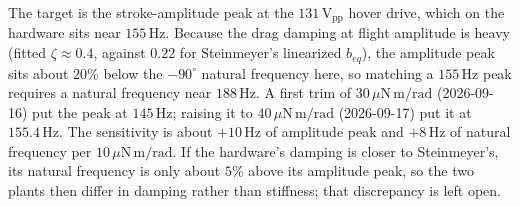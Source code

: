 \documentclass{article}
\begin{document}
The target is the stroke-amplitude peak at the \(131\,\mathrm{V_{pp}}\) hover drive, which on the hardware sits near \(155\,\mathrm{Hz}\). Because the drag damping at flight amplitude is heavy (fitted \(\zeta \approx 0.4\), against \(0.22\) for Steinmeyer's linearized \(b_{eq}\)), the amplitude peak sits about \(20\%\) below the \(-90^\circ\) natural frequency here, so matching a \(155\,\mathrm{Hz}\) peak requires a natural frequency near \(188\,\mathrm{Hz}\). A first trim of \(30\,\mu\mathrm{N\,m/rad}\) (2026-09-16) put the peak at \(145\,\mathrm{Hz}\); raising it to \(40\,\mu\mathrm{N\,m/rad}\) (2026-09-17) put it at \(155.4\,\mathrm{Hz}\). The sensitivity is about \(+10\,\mathrm{Hz}\) of amplitude peak and \(+8\,\mathrm{Hz}\) of natural frequency per \(10\,\mu\mathrm{N\,m/rad}\). If the hardware's damping is closer to Steinmeyer's, its natural frequency is only about \(5\%\) above its amplitude peak, so the two plants then differ in damping rather than stiffness; that discrepancy is left open.
\end{document}
